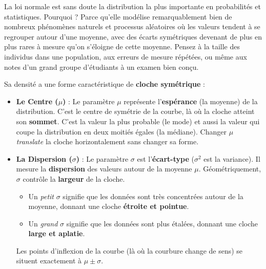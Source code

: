 \begin{intuitionbox}
La loi normale est sans doute la distribution la plus importante en probabilités et statistiques. Pourquoi ? Parce qu'elle modélise remarquablement bien de nombreux phénomènes naturels et processus aléatoires où les valeurs tendent à se regrouper autour d'une moyenne, avec des écarts symétriques devenant de plus en plus rares à mesure qu'on s'éloigne de cette moyenne. Pensez à la taille des individus dans une population, aux erreurs de mesure répétées, ou même aux notes d'un grand groupe d'étudiants à un examen bien conçu. 

Sa densité a une forme caractéristique de \textbf{cloche symétrique} :
\begin{itemize}
    \item \textbf{Le Centre ($\mu$)} : Le paramètre $\mu$ représente l'\textbf{espérance} (la moyenne) de la distribution. C'est le centre de symétrie de la courbe, là où la cloche atteint son \textbf{sommet}. C'est la valeur la plus probable (le mode) et aussi la valeur qui coupe la distribution en deux moitiés égales (la médiane). Changer $\mu$ \textit{translate} la cloche horizontalement sans changer sa forme.
    \item \textbf{La Dispersion ($\sigma$)} : Le paramètre $\sigma$ est l'\textbf{écart-type} ($\sigma^2$ est la variance). Il mesure la \textbf{dispersion} des valeurs autour de la moyenne $\mu$. Géométriquement, $\sigma$ contrôle la \textbf{largeur} de la cloche.
        \begin{itemize}
            \item Un \textit{petit} $\sigma$ signifie que les données sont très concentrées autour de la moyenne, donnant une cloche \textbf{étroite et pointue}.
            \item Un \textit{grand} $\sigma$ signifie que les données sont plus étalées, donnant une cloche \textbf{large et aplatie}.
        \end{itemize}
    Les points d'inflexion de la courbe (là où la courbure change de sens) se situent exactement à $\mu \pm \sigma$.
\end{itemize}

\tcblower
\centering
{}
\end{intuitionbox}
